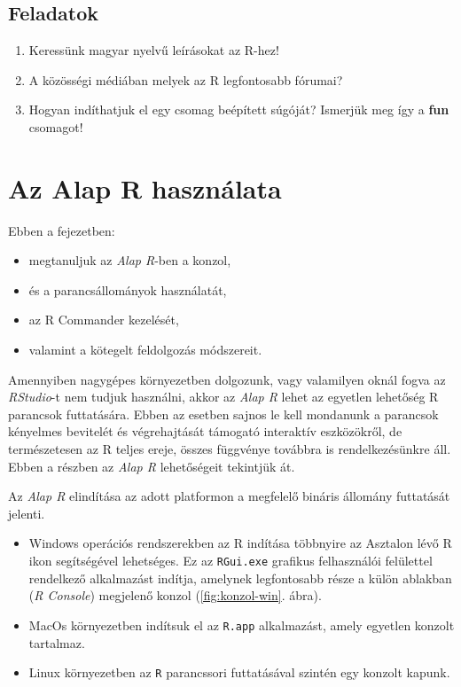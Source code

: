\documentclass[
]{book}
\makeatletter
\providecommand{\tightlist}{%
  \setlength{\itemsep}{0pt}\setlength{\parskip}{0pt}}
\newenvironment{kframe}{%
\medskip{}
\setlength{\fboxsep}{.8em}
 \def\at@end@of@kframe{}%
 \ifinner\ifhmode%
  \def\at@end@of@kframe{\end{minipage}}%
  \begin{minipage}{\columnwidth}%
 \fi\fi%
 \def\FrameCommand##1{\hskip\@totalleftmargin \hskip-\fboxsep
 \colorbox{shadecolor}{##1}\hskip-\fboxsep
     \hskip-\linewidth \hskip-\@totalleftmargin \hskip\columnwidth}%
 \MakeFramed {\advance\hsize-\width
   \@totalleftmargin\z@ \linewidth\hsize
   \@setminipage}}%
 {\par\unskip\endMakeFramed%
 \at@end@of@kframe}
\newenvironment{rmdblock}[1]
  {
  \begin{itemize}
  \renewcommand{\labelitemi}{
    \raisebox{-.7\height}[0pt][0pt]{
      {\setkeys{Gin}{width=3em,keepaspectratio}\texttt{[image: images/\#1]}}
    }
  }
  \setlength{\fboxsep}{1em}
  \begin{kframe}
  \item
  }
  {
  \end{kframe}
  \end{itemize}
  }
\newenvironment{rmdlevel3}
  {\begin{rmdblock}{level3}}
  {\end{rmdblock}}
\newenvironment{rmdexercise}
  {\begin{rmdblock}{exercise}}
  {\end{rmdblock}}
\makeatother
\begin{document}
\hypertarget{munka-az-r-ben-2-exercise}{%
\subsection{Feladatok}\label{munka-az-r-ben-2-exercise}}

\begin{rmdexercise}
\begin{enumerate}
\def\labelenumi{\arabic{enumi}.}
\tightlist
\item
  Keressünk magyar nyelvű leírásokat az R-hez!
\item
  A közösségi médiában melyek az R legfontosabb fórumai?
\item
  Hogyan indíthatjuk el egy csomag beépített súgóját? Ismerjük meg így a \textbf{fun} csomagot!
\end{enumerate}
\end{rmdexercise}

\hypertarget{az-alap-r-hasznuxe1lata}{%
\section{Az Alap R használata}\label{az-alap-r-hasznuxe1lata}}

\begin{rmdlevel3}
Ebben a fejezetben:

\begin{itemize}
\tightlist
\item
  megtanuljuk az \emph{Alap R}-ben a konzol,
\item
  és a parancsállományok használatát,
\item
  az R Commander kezelését,
\item
  valamint a kötegelt feldolgozás módszereit.
\end{itemize}
\end{rmdlevel3}

Amennyiben nagygépes környezetben dolgozunk, vagy valamilyen oknál fogva az \emph{RStudio}-t nem tudjuk használni, akkor az \emph{Alap R} lehet az egyetlen lehetőség R parancsok futtatására. Ebben az esetben sajnos le kell mondanunk a parancsok kényelmes bevitelét és végrehajtását támogató interaktív eszközökről, de természetesen az R teljes ereje, összes függvénye továbbra is rendelkezésünkre áll. Ebben a részben az \emph{Alap R} lehetőségeit tekintjük át.

Az \emph{Alap R} elindítása az adott platformon a megfelelő bináris állomány futtatását jelenti.

\begin{itemize}
\tightlist
\item
  Windows operációs rendszerekben az R indítása többnyire az Asztalon lévő R ikon segítségével lehetséges. Ez az \texttt{RGui.exe} grafikus felhasználói felülettel rendelkező alkalmazást indítja, amelynek legfontosabb része a külön ablakban (\emph{R Console}) megjelenő konzol (\ref{fig:konzol-win}. ábra).
\item
  MacOs környezetben indítsuk el az \texttt{R.app} alkalmazást, amely egyetlen konzolt tartalmaz.
\item
  Linux környezetben az \texttt{R} parancssori futtatásával szintén egy konzolt kapunk.
\end{itemize}
\end{document}
